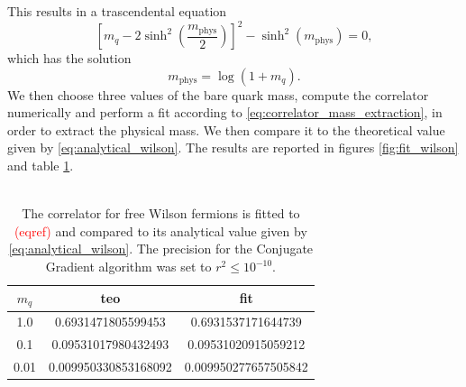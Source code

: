 This results in a trascendental equation 
\begin{equation*}
    \left[m_q - 2 \sinh^2\left(\frac{m_\text{phys}}{2}\right)\right]^2 - \sinh^2\left(m_\text{phys}\right) = 0,
\end{equation*}
which has the solution 
\begin{equation}
    m_\text{phys} = \log\left(1+m_q\right).
    \label{eq:analytical_wilson}
\end{equation}
We then choose three values of the bare quark mass, compute the correlator numerically and perform a fit according to \eqref{eq:correlator_mass_extraction}, in order to extract the physical mass. We then compare it to the theoretical value given by \eqref{eq:analytical_wilson}. The results are reported in figures \ref{fig:fit_wilson} and table \ref{tab:free_wilson_fit}. \\~\\
\begin{table}
    \centering
    \begin{tabular}[pos]{ccc}
        \toprule
        $m_q$ & teo & fit \\
        \midrule 
        1.0 & 0.6931471805599453 & 0.6931537171644739 \\
        0.1 & 0.09531017980432493 & 0.09531020915059212 \\
        0.01 & 0.009950330853168092 & 0.009950277657505842 \\
        \bottomrule
    \end{tabular}
    \caption[Fit of the correlator for free Wilson fermions.]{The correlator for free Wilson fermions is fitted to \textcolor{red}{(eqref)} and compared to its analytical value given by \eqref{eq:analytical_wilson}. The precision for the Conjugate Gradient algorithm was set to $r^2 \leq 10^{-10}$.}
    \label{tab:free_wilson_fit}
\end{table}

